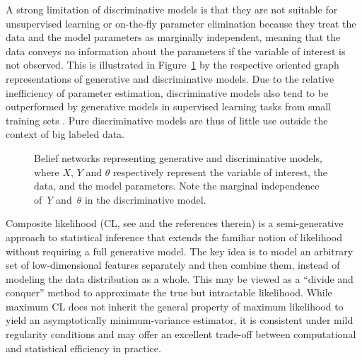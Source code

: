 \documentclass[english]{scrartcl}
\begin{document}
A strong limitation of discriminative models is that they are not suitable for unsupervised learning or on-the-fly parameter elimination because they treat the data and the model parameters as marginally independent, meaning that the data conveys no information about the parameters if the variable of interest is not observed. This is illustrated in Figure~\ref{fig:graph_comparison} by the respective oriented graph representations of generative and discriminative models. Due to the relative inefficiency of parameter estimation, discriminative models also tend to be outperformed by generative models in supervised learning tasks from small training sets \cite{Ng-01}. Pure discriminative models are thus of little use outside the context of big labeled data.


\begin{figure}[!ht]
\begin{center}
\hspace*{.2\textwidth}
\caption{Belief networks representing generative and discriminative models, where $X$, $Y$ and $\theta$ respectively represent the variable of interest, the data, and the model parameters. Note the marginal independence of~$Y$ and~$\theta$ in the discriminative model.}
\label{fig:graph_comparison}
\end{center}
\end{figure}

Composite likelihood (CL, see \cite{Varin-11} and the references therein) is a semi-generative approach to statistical inference that extends the familiar notion of likelihood without requiring a full generative model. The key idea is to model an arbitrary set of low-dimensional features separately and then combine them, instead of modeling the data distribution as a whole. This may be viewed as a ``divide and conquer'' method to approximate the true but intractable likelihood. While maximum CL does not inherit the general property of maximum likelihood to yield an asymptotically minimum-variance estimator, it is consistent under mild regularity conditions \cite{Xu-11} and may offer an excellent trade-off between computational and statistical efficiency in practice. 
\end{document}
